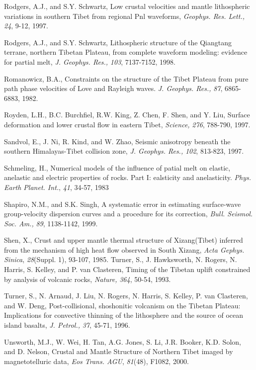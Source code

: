 \documentclass[12pt]{article}
\begin{document}
\begin{references}
Rodgers, A.J., and S.Y. Schwartz, Low crustal velocities and mantle
lithospheric variations in southern Tibet from regional Pnl waveforms,
{\it Geophys. Res. Lett.,} {\it 24}, 9-12, 1997.

Rodgers, A.J., and S.Y. Schwartz, Lithospheric structure of the
Qiangtang terrane, northern Tibetan Plateau, from complete waveform
modeling: evidence for partial melt, {\it J. Geophys. Res.,} {\it 103},
7137-7152, 1998.

Romanowicz, B.A., Constraints on the structure of the Tibet Plateau
from pure path phase velocities of Love and Rayleigh waves. {\it J. Geophys.
Res.,} {\it 87}, 6865-6883, 1982.

Royden, L.H., B.C. Burchfiel, R.W. King, Z. Chen, F. Shen, and Y. Liu,
Surface deformation and lower crustal flow in eastern Tibet, {\it Science,}
{\it 276}, 788-790, 1997.

Sandvol, E., J. Ni, R. Kind, and W. Zhao, Seismic anisotropy
beneath the southern Himalayas-Tibet collision zone, {\it J. Geophys. Res.,}
{\it 102}, 813-823, 1997.

Schmeling, H., Numerical models of the influence of patial melt on
elastic, anelastic and electric properties of rocks. Part I:
ealsticity and anelasticity. {\it Phys. Earth Planet. Int.}, {\it 41},
34-57, 1983

Shapiro, N.M., and S.K. Singh, A systematic error in estimating
surface-wave group-velocity dispersion curves and a procedure for its
correction, {\it Bull. Seismol. Soc. Am.,} {\it 89}, 1138-1142, 1999.

Shen, X., Crust and upper mantle thermal structure of Xizang(Tibet)
inferred from the mechanism of high heat flow observed in South
Xizang, {\it Acta Gephys. Sinica}, {\it 28}(Suppl. 1), 93-107, 1985.
Turner, S., J. Hawksworth, N. Rogers, N. Harris, S. Kelley, and P. van
Clasteren, Timing of the Tibetan uplift constrained
by analysis of volcanic rocks, {\it Nature,} {\it 364}, 50-54, 1993.

Turner, S., N. Arnaud, J. Liu, N. Rogers, N. Harris, S. Kelley, P. van
Clasteren, and W. Deng, Post-collisional, shoshonitic volcanism
on the Tibetan Plateau: Implications for convective thinning of the
lithosphere and the source of ocean island basalts, {\it J. Petrol.,}
{\it 37}, 45-71, 1996.

Unsworth, M.J., W. Wei, H. Tan, A.G. Jones, S. Li, J.R. Booker, K.D. Solon,
and D. Nelson, Crustal and Mantle Structure of Northern Tibet imaged by
magnetotelluric data, {\it Eos Trans. AGU}, {\it 81}(48), F1082, 2000.


\end{references}
\end{document}
